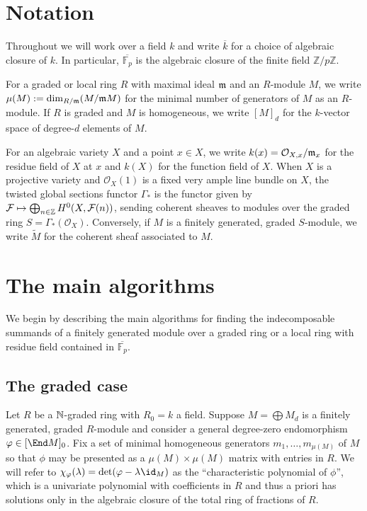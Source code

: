 \documentclass[12pt]{article}
\let\wtilde\widetilde
\def\cF{\mathcal F}
\def\OO{\mathcal O}
\def\FF{\mathbb F}
\def\ZZ{\mathbb Z}
\theoremstyle{theorem}
\numberwithin{thm}{section}
\theoremstyle{definition}
\newcommand{\mahrud}[1]{{\color{ForestGreen} \sf $\blacklozenge$ Mahrud: [#1]}}
\begin{document}
\section{Notation}

Throughout we will work over a field $k$ and write $\overline k$ for a choice of algebraic closure of $k$. \linebreak In particular, $\overline{\FF_p}$ is the algebraic closure of the finite field $\ZZ/p\ZZ$.

For a graded or local ring $R$ with maximal ideal $\mathfrak m$ and an $R$-module $M$, we write $\mu(M):=\dim_{R/\mathfrak m}(M/\mathfrak m M)$ for the minimal number of generators of $M$ as an $R$-module.
If $R$ is graded and $M$ is homogeneous, we write $[M]_d$ for the $k$-vector space of degree-$d$ elements of $M$.

For an algebraic variety $X$ and a point $x\in X$, we write $k(x)=\OO_{X,x}/\m_x$ for the residue field of $X$ at $x$ and $k(X)$ for the function field of $X$.
%
When $X$ is a projective variety and $\OO_X(1)$ is a fixed very ample line bundle on $X$, the twisted global sections functor $\Gamma_*$ is the functor given by $\cF \mapsto \bigoplus_{n\in \Z} H^0(X, \cF(n))$, sending coherent sheaves to modules over the graded ring $S = \Gamma_*(\OO_X)$. Conversely, if $M$ is a finitely generated, graded $S$-module, we write $\wtilde M$ for the coherent sheaf associated to $M$.

\section{The main algorithms}

We begin by describing the main algorithms for finding the indecomposable summands of a finitely generated module over a graded ring or a local ring with residue field contained in $\overline{\FF_p}$.

\subsection{The graded case}\label{sec:graded-alg}

Let $R$ be a $\mathbb N$-graded ring with $R_0 = k$ a field. Suppose $M = \bigoplus M_d$ is a finitely generated, graded $R$-module and consider a general degree-zero endomorphism $\phi \in [\End M]_0$. Fix a set of minimal homogeneous generators $m_1,\dots,m_{\mu(M)}$ of $M$ so that $\phi$ may be presented as a $\mu(M)\times\mu(M)$ matrix with entries in $R$. We will refer to $\chi_\phi(\lambda) = \det(\phi-\lambda\id_M)$ as the ``characteristic polynomial of $\phi$'', which is a univariate polynomial with coefficients in $R$ and thus a priori has solutions only in the algebraic closure of the total ring of fractions of $R$.
\end{document}
